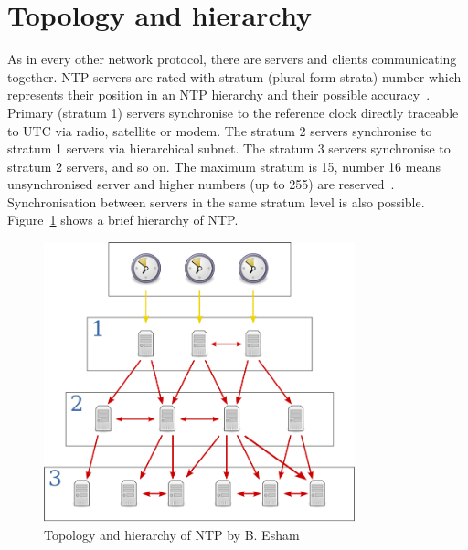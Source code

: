 
\section{Topology and hierarchy}
As in every other network protocol, there are servers and clients communicating together.
NTP servers are rated with stratum (plural form strata) number which represents their position
in an NTP hierarchy and their possible accuracy~\cite{rfc5905}.
Primary (stratum 1) servers synchronise to the reference clock directly traceable to UTC via
radio, satellite or modem.
The stratum 2 servers synchronise to stratum 1
servers via hierarchical subnet.
The stratum 3 servers synchronise to stratum 2 servers, and so on.
The maximum stratum is 15, number 16 means unsynchronised server
and higher numbers (up to 255) are reserved~\cite{rfc5905}.
Synchronisation between servers in the same stratum level is also possible.
Figure~\ref{fig:ntp-hierarchy} shows a brief hierarchy of NTP.
\begin{figure}
  \centering
  \includegraphics[width=9cm,keepaspectratio]{fig/Network_Time_Protocol_servers_and_clients.pdf}
  \caption{Topology and hierarchy of NTP by B. Esham}
  \label{fig:ntp-hierarchy}
  \bigskip
\end{figure}
